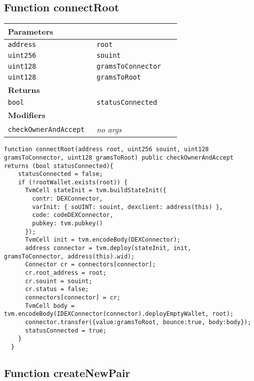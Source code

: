 \subsection{Function connectRoot}


\ifsoltables
\noindent\begin{tabular}{|l|l|p{5cm}|}\hline
\multicolumn{3}{|l|}{\bf Parameters}\\\hline
\tt address & \tt root &\\\hline
\tt uint256 & \tt souint &\\\hline
\tt uint128 & \tt gramsToConnector &\\\hline
\tt uint128 & \tt gramsToRoot &\\\hline
\multicolumn{3}{|l|}{\bf Returns}\\\hline
\tt bool & \tt statusConnected &\\\hline
\multicolumn{3}{|l|}{\bf Modifiers}\\\hline
\tt checkOwnerAndAccept & {\em no args} &\\\hline
\end{tabular}
\fi



\begin{lstlisting}[firstnumber=158]
  function connectRoot(address root, uint256 souint, uint128 gramsToConnector, uint128 gramsToRoot) public checkOwnerAndAccept returns (bool statusConnected){
    statusConnected = false;
    if (!rootWallet.exists(root)) {
      TvmCell stateInit = tvm.buildStateInit({
        contr: DEXConnector,
        varInit: { soUINT: souint, dexclient: address(this) },
        code: codeDEXConnector,
        pubkey: tvm.pubkey()
      });
      TvmCell init = tvm.encodeBody(DEXConnector);
      address connector = tvm.deploy(stateInit, init, gramsToConnector, address(this).wid);
      Connector cr = connectors[connector];
      cr.root_address = root;
      cr.souint = souint;
      cr.status = false;
      connectors[connector] = cr;
      TvmCell body = tvm.encodeBody(IDEXConnector(connector).deployEmptyWallet, root);
      connector.transfer({value:gramsToRoot, bounce:true, body:body});
      statusConnected = true;
    }
  }
\end{lstlisting}

\subsection{Function createNewPair}


